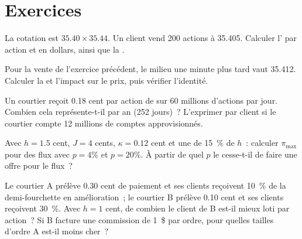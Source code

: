 \section{Exercices}

\begin{exercise}[$\star$]\label{exo:m1:retail-flow-and-wholesaling:1}
La cotation est $35.40 \times 35.44$. Un client vend 200 actions à 35.405.
Calculer l' par action et en dollars, ainsi que la
.
\end{exercise}

\begin{exercise}[$\star$]\label{exo:m1:retail-flow-and-wholesaling:2}
Pour la vente de l'exercice précédent, le milieu une minute plus tard vaut 35.412.
Calculer la  et l'impact sur le prix, puis vérifier
l'identité.
\end{exercise}

\begin{exercise}[$\star$]\label{exo:m1:retail-flow-and-wholesaling:3}
Un courtier reçoit 0.18 cent par action de  sur 60 millions
d'actions par jour. Combien cela représente-t-il par an (252 jours)~? L'exprimer par client si
le courtier compte 12 millions de comptes approvisionnés.
\end{exercise}

\begin{exercise}[$\star\star$]\label{exo:m1:retail-flow-and-wholesaling:4}
Avec $h = 1.5$ cent, $J = 4$ cents, $\kappa = 0.12$ cent et une 
de 15~\% de $h$~: calculer $\pi_{\max}$ pour des flux avec $p = 4\%$ et
$p = 20\%$. À partir de quel $p$ le  cesse-t-il de faire une offre pour le flux~?
\end{exercise}

\begin{exercise}[$\star\star$]\label{exo:m1:retail-flow-and-wholesaling:5}
Le courtier A prélève 0.30 cent de paiement et ses clients reçoivent 10~\% de la
demi-fourchette en amélioration~; le courtier B prélève 0.10 cent et ses clients
reçoivent 30~\%. Avec $h = 1$ cent, de combien le client de B est-il mieux loti par action~? Si B
facture une commission de 1~\$ par ordre, pour quelles tailles d'ordre A est-il moins cher~?
\end{exercise}

